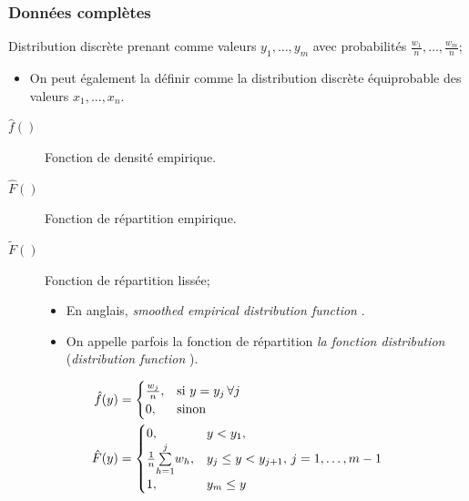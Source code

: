\documentclass[10pt, french]{article}
\begin{document}
\begin{multicols*}{2}
\subsubsection{Données complètes}
\begin{definitionNOHFILL}
Distribution discrète prenant comme valeurs $y_{1}, \dots, y_{m}$ avec probabilités $\frac{w_{1}}{n}, \dots, \frac{w_{m}}{n}$;
\begin{itemize}
	\item	On peut également la définir comme la distribution discrète équiprobable des valeurs $x_{1}, \dots, x_{n}$.
\end{itemize}
\end{definitionNOHFILL}

\begin{distributions}[Notation]
\begin{description}
	\item[$\hat{f}()$]	Fonction de densité empirique.	
	\item[$\hat{F}()$]	Fonction de répartition empirique.	
	\item[$\tilde{F}()$]	Fonction de répartition lissée;
		\begin{itemize}
		\item	En anglais, \og \textit{smoothed empirical distribution function} \fg{}.
		\item	On appelle parfois la fonction de répartition \textit{la fonction distribution} (\og \textit{distribution function} \fg{}).
		\end{itemize}
\end{description}
\end{distributions}

\begin{align*}
	\hat{f}(y)
	&=	\begin{cases}
		\frac{w_{j}}{n},	&	\text{si } y = y_{j} \, \forall j	\\
		0,	&	\text{sinon}
		\end{cases}	\\
		\hat{F}(y)
	&=	\begin{cases}
		0,	&	y	<	y_{1},	\\
		\frac{1}{n}\overset{j}{\underset{h = 1}{\sum}}w_{h},	&	y_{j}	\leq	y	<	y_{j + 1}, \, j	=	1, \dots, m - 1	\\
		1,	&	y_{m}	\leq	y
		\end{cases}
\end{align*}		


\end{multicols*}
\end{document}
